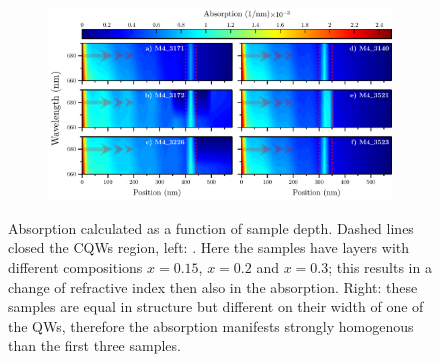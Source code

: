 \begin{figure}[hbt!]
	\centering
	\begin{subfigure}{\textwidth}
		\includegraphics[width=\textwidth]{../figures/chapter-3/absorption-simulations/build/abs-calcs.pdf}
		\label{subfig:chapter-3-Absorption-M4_3171-a)}
		\label{subfig:chapter-3-Absorption-M4_3172-b)}
		\label{subfig:chapter-3-Absorption-M4_3226-c)}
		\label{subfig:chapter-3-Absorption-M4_3140-d)}
		\label{subfig:chapter-3-Absorption-M4_3521-e)}
		\label{subfig:chapter-3-Absorption-M4_3523-f)}
	\end{subfigure}
	\caption{
Absorption calculated as a function of sample depth. Dashed lines closed the CQWs
region, left: . Here the samples have \algaas layers with different compositions $x = 0.15$, $x = 0.2$ and $x = 0.3$; this results in a change of refractive index then also in the absorption. Right: these samples are equal in structure but different on their width of one of the QWs, therefore the absorption manifests strongly homogenous than the first three samples.
	}
	\label{fig:chapter-3-PL-Absorption-Calcs}
\end{figure}

